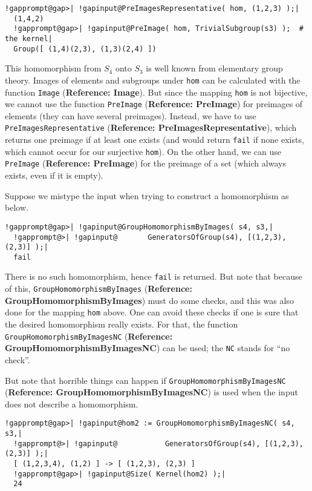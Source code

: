 \documentclass[a4paper,11pt]{report}
\begin{document}
{{ 
\begin{Verbatim}[commandchars=!@|,fontsize=\small,frame=single,label=Example]
  !gapprompt@gap>| !gapinput@PreImagesRepresentative( hom, (1,2,3) );|
  (1,4,2)
  !gapprompt@gap>| !gapinput@PreImage( hom, TrivialSubgroup(s3) );  # the kernel|
  Group([ (1,4)(2,3), (1,3)(2,4) ])
\end{Verbatim}
 

 This homomorphism from $S_4$ onto $S_3$ is well known from elementary group theory. Images of elements and subgroups
under \texttt{hom} can be calculated with the function \texttt{Image} (\textbf{Reference: Image}). But since the mapping \texttt{hom} is not bijective, we cannot use the function \texttt{PreImage} (\textbf{Reference: PreImage}) for preimages of elements (they can have several preimages). Instead, we have
to use \texttt{PreImagesRepresentative} (\textbf{Reference: PreImagesRepresentative}), which returns one preimage if at least one exists (and would return \texttt{fail} if none exists, which cannot occur for our surjective \texttt{hom}). On the other hand, we can use \texttt{PreImage} (\textbf{Reference: PreImage}) for the preimage of a set (which always exists, even if it is empty). 

 Suppose we mistype the input when trying to construct a homomorphism as below. 

 
\begin{Verbatim}[commandchars=!@|,fontsize=\small,frame=single,label=Example]
  !gapprompt@gap>| !gapinput@GroupHomomorphismByImages( s4, s3,|
  !gapprompt@>| !gapinput@       GeneratorsOfGroup(s4), [(1,2,3),(2,3)] );|
  fail
\end{Verbatim}
 

 There is no such homomorphism, hence \texttt{fail} is returned. But note that because of this, \texttt{GroupHomomorphismByImages} (\textbf{Reference: GroupHomomorphismByImages}) must do some checks, and this was also done for the mapping \texttt{hom} above. One can avoid these checks if one is sure that the desired homomorphism
really exists. For that, the function \texttt{GroupHomomorphismByImagesNC} (\textbf{Reference: GroupHomomorphismByImagesNC}) can be used; the \texttt{NC} stands for ``no check''. 

 But note that horrible things can happen if \texttt{GroupHomomorphismByImagesNC} (\textbf{Reference: GroupHomomorphismByImagesNC}) is used when the input does not describe a homomorphism. 

 
\begin{Verbatim}[commandchars=!@|,fontsize=\small,frame=single,label=Example]
  !gapprompt@gap>| !gapinput@hom2 := GroupHomomorphismByImagesNC( s4, s3,|
  !gapprompt@>| !gapinput@           GeneratorsOfGroup(s4), [(1,2,3),(2,3)] );|
  [ (1,2,3,4), (1,2) ] -> [ (1,2,3), (2,3) ]
  !gapprompt@gap>| !gapinput@Size( Kernel(hom2) );|
  24
\end{Verbatim}
 

}}
\end{document}
